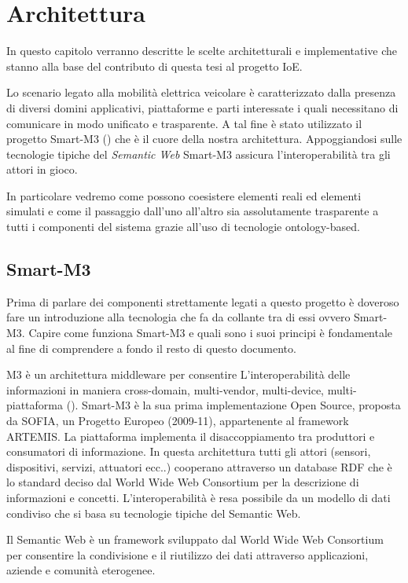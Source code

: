 \chapter{Architettura}

In questo capitolo verranno descritte le scelte architetturali e implementative che stanno alla base del contributo di questa tesi al progetto IoE. 

Lo scenario legato alla mobilità elettrica veicolare è caratterizzato dalla presenza di diversi domini applicativi, piattaforme e parti interessate i quali necessitano di comunicare in modo unificato e trasparente. A tal fine è stato utilizzato il progetto Smart-M3 (\cite{tullio2011}) che è il cuore della nostra architettura. Appoggiandosi sulle tecnologie tipiche del \emph{Semantic Web} Smart-M3 assicura l'interoperabilità tra gli attori in gioco. 

In particolare vedremo come possono coesistere elementi reali ed elementi simulati e come il passaggio dall'uno all'altro sia assolutamente trasparente a tutti i componenti del sistema grazie all'uso di tecnologie ontology-based.

\section{Smart-M3}\label{sec:smart-m3}

Prima di parlare dei componenti strettamente legati a questo progetto è doveroso fare un introduzione alla tecnologia che fa da collante tra di essi ovvero Smart-M3. Capire come funziona Smart-M3 e quali sono i suoi principi è fondamentale al fine di comprendere a fondo il resto di questo documento.

M3 è un architettura middleware per consentire L'interoperabilità delle informazioni in maniera cross-domain, multi-vendor, multi-device, multi-piattaforma (\cite{smart2013}). Smart-M3 è la sua prima implementazione Open Source, proposta da SOFIA, un Progetto Europeo (2009-11), appartenente al framework ARTEMIS. 
La piattaforma implementa il disaccoppiamento tra produttori e consumatori di informazione. In questa architettura tutti gli attori (sensori, dispositivi, servizi, attuatori ecc..) cooperano attraverso un database RDF che è lo standard deciso dal World Wide Web Consortium per la descrizione di informazioni e concetti. L'interoperabilità è resa possibile da un modello di dati condiviso che si basa su tecnologie tipiche del Semantic Web.

Il Semantic Web è un framework sviluppato dal World Wide Web Consortium per consentire la condivisione e il riutilizzo dei dati attraverso  applicazioni, aziende e comunità eterogenee.

